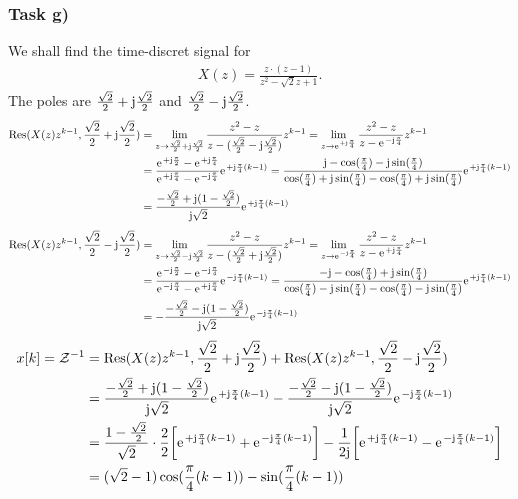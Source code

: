 \subsubsection{Task g)}
We shall find the time-discret signal for
\begin{align}
	X(z)=\frac{z\cdot(z-1)}{z^2-\sqrt{2}z+1}.
\end{align}
The poles are $\frac{\sqrt{2}}{2}+\im\frac{\sqrt{2}}{2}$ and $\frac{\sqrt{2}}{2}-\im\frac{\sqrt{2}}{2}$.
\begin{align}
	\mathrm{Res}(X(z)z^{k-1},\frac{\sqrt{2}}{2}+\im\frac{\sqrt{2}}{2})&=\lim\limits_{z\rightarrow\frac{\sqrt{2}}{2}+\im\frac{\sqrt{2}}{2}}\frac{z^2-z}{z-(\frac{\sqrt{2}}{2}-\im\frac{\sqrt{2}}{2})}z^{k-1}=\lim\limits_{z\rightarrow\e^{+\im\frac{\pi}{4}}}\frac{z^2-z}{z-\e^{-\im\frac{\pi}{4}}}z^{k-1}\nonumber\\
	&=\frac{\e^{+\im\frac{\pi}{2}}-\e^{+\im\frac{\pi}{4}}}{\e^{+\im\frac{\pi}{4}}-\e^{-\im\frac{\pi}{4}}}\e^{+\im\frac{\pi}{4}(k-1)}=\frac{\im-\cos(\frac{\pi}{4})-\im\sin(\frac{\pi}{4})}{\cos(\frac{\pi}{4})+\im\sin(\frac{\pi}{4})-\cos(\frac{\pi}{4})+\im\sin(\frac{\pi}{4})}\e^{+\im\frac{\pi}{4}(k-1)}\nonumber\\
	&=\frac{-\frac{\sqrt{2}}{2}+\im(1-\frac{\sqrt{2}}{2})}{\im\sqrt{2}}\e^{+\im\frac{\pi}{4}(k-1)}
\end{align}
\begin{align}
	\mathrm{Res}(X(z)z^{k-1},\frac{\sqrt{2}}{2}-\im\frac{\sqrt{2}}{2})&=\lim\limits_{z\rightarrow\frac{\sqrt{2}}{2}-\im\frac{\sqrt{2}}{2}}\frac{z^2-z}{z-(\frac{\sqrt{2}}{2}+\im\frac{\sqrt{2}}{2})}z^{k-1}=\lim\limits_{z\rightarrow\e^{-\im\frac{\pi}{4}}}\frac{z^2-z}{z-\e^{+\im\frac{\pi}{4}}}z^{k-1}\nonumber\\
	&=\frac{\e^{-\im\frac{\pi}{2}}-\e^{-\im\frac{\pi}{4}}}{\e^{-\im\frac{\pi}{4}}-\e^{+\im\frac{\pi}{4}}}\e^{-\im\frac{\pi}{4}(k-1)}=\frac{-\im-\cos(\frac{\pi}{4})+\im\sin(\frac{\pi}{4})}{\cos(\frac{\pi}{4})-\im\sin(\frac{\pi}{4})-\cos(\frac{\pi}{4})-\im\sin(\frac{\pi}{4})}\e^{+\im\frac{\pi}{4}(k-1)}\nonumber\\
	&=-\frac{-\frac{\sqrt{2}}{2}-\im(1-\frac{\sqrt{2}}{2})}{\im\sqrt{2}}\e^{-\im\frac{\pi}{4}(k-1)}
\end{align}
\begin{align}
	x[k]=\mathcal{Z}^{-1}&=\mathrm{Res}(X(z)z^{k-1},\frac{\sqrt{2}}{2}+\im\frac{\sqrt{2}}{2})+\mathrm{Res}(X(z)z^{k-1},\frac{\sqrt{2}}{2}-\im\frac{\sqrt{2}}{2})\nonumber\\
	&=\frac{-\frac{\sqrt{2}}{2}+\im(1-\frac{\sqrt{2}}{2})}{\im\sqrt{2}}\e^{+\im\frac{\pi}{4}(k-1)}-\frac{-\frac{\sqrt{2}}{2}-\im(1-\frac{\sqrt{2}}{2})}{\im\sqrt{2}}\e^{-\im\frac{\pi}{4}(k-1)}\nonumber\\
	&=\frac{1-\frac{\sqrt{2}}{2}}{\sqrt{2}}\cdot\frac{2}{2}\bigg[\e^{+\im\frac{\pi}{4}(k-1)}+\e^{-\im\frac{\pi}{4}(k-1)}\bigg ]-\frac{1}{2\im}\bigg[\e^{+\im\frac{\pi}{4}(k-1)}-\e^{-\im\frac{\pi}{4}(k-1)}\bigg]\nonumber\\
	&=(\sqrt{2}-1)\cos(\frac{\pi}{4}(k-1))-\sin(\frac{\pi}{4}(k-1))
\end{align}